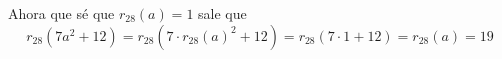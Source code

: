\begin{enumerate}[label=\purple{\alph*)}]
        Ahora que sé que $r_{28}(a) = 1$ sale que
        $$
          r_{28}(7a^2 + 12) = r_{28}( 7 \cdot r_{28}(a)^2 + 12) = r_{28}(7 \cdot 1 + 12 ) = r_{28}(a) = 19
        $$
\end{enumerate}

\begin{aportes}
  \item {}
  \item {}
\end{aportes}
